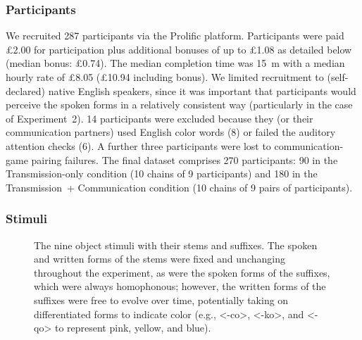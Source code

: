 \documentclass[doc,biblatex]{apa7}
\begin{document}
\subsubsection{Participants}

We recruited 287 participants via the Prolific platform. Participants were paid £2.00 for participation plus additional bonuses of up to £1.08 as detailed below (median bonus: £0.74). The median completion time was 15~m with a median hourly rate of £8.05 (£10.94 including bonus). We limited recruitment to (self-declared) native English speakers, since it was important that participants would perceive the spoken forms in a relatively consistent way (particularly in the case of Experiment~2). 14 participants were excluded because they (or their communication partners) used English color words (8) or failed the auditory attention checks (6). A further three participants were lost to communication-game pairing failures. The final dataset comprises 270 participants: 90 in the Transmission-only condition (10 chains of 9 participants) and 180 in the Transmission~+ Communication condition (10 chains of 9 pairs of participants).

\subsubsection{Stimuli}

	\begin{figure}
	\vspace*{2pt}
	\caption{The nine object stimuli with their stems and suffixes. The spoken and written forms of the stems were fixed and unchanging throughout the experiment, as were the spoken forms of the suffixes, which were always homophonous; however, the written forms of the suffixes were free to evolve over time, potentially taking on differentiated forms to indicate color (e.g., <-co>, <-ko>, and <-qo> to represent pink, yellow, and blue).}
	\label{stimuli}
	\end{figure}
\end{document}
